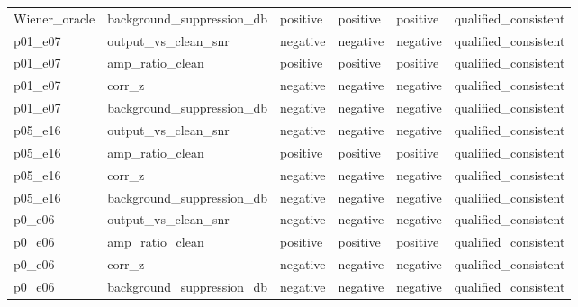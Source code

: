 \begin{tabular}{llllll}
Wiener\_oracle & background\_suppression\_db & positive & positive & positive & qualified\_consistent \\
p01\_e07 & output\_vs\_clean\_snr & negative & negative & negative & qualified\_consistent \\
p01\_e07 & amp\_ratio\_clean & positive & positive & positive & qualified\_consistent \\
p01\_e07 & corr\_z & negative & negative & negative & qualified\_consistent \\
p01\_e07 & background\_suppression\_db & negative & negative & negative & qualified\_consistent \\
p05\_e16 & output\_vs\_clean\_snr & negative & negative & negative & qualified\_consistent \\
p05\_e16 & amp\_ratio\_clean & positive & positive & positive & qualified\_consistent \\
p05\_e16 & corr\_z & negative & negative & negative & qualified\_consistent \\
p05\_e16 & background\_suppression\_db & negative & negative & negative & qualified\_consistent \\
p0\_e06 & output\_vs\_clean\_snr & negative & negative & negative & qualified\_consistent \\
p0\_e06 & amp\_ratio\_clean & positive & positive & positive & qualified\_consistent \\
p0\_e06 & corr\_z & negative & negative & negative & qualified\_consistent \\
p0\_e06 & background\_suppression\_db & negative & negative & negative & qualified\_consistent \\
\bottomrule
\end{tabular}
